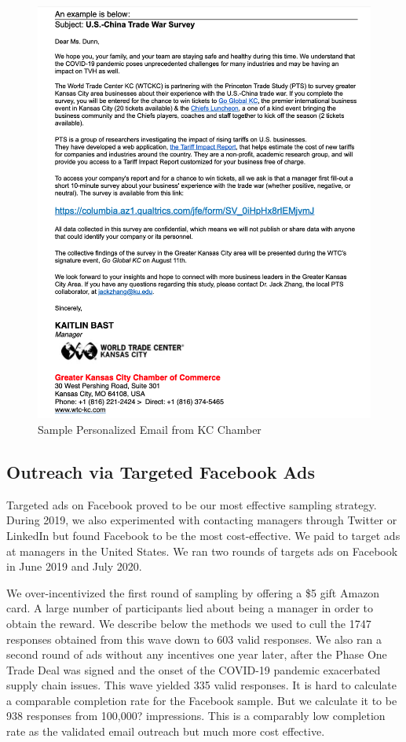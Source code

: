 \begin{figure}
    \centering
\includegraphics[scale=.5]{KC chamber email.png}
    \caption{Sample Personalized Email from KC Chamber}
    \label{fig:kcchamber}
\end{figure}

\subsection{Outreach via Targeted Facebook Ads}

Targeted ads on Facebook proved to be our most effective sampling strategy. During 2019, we also experimented with contacting managers through Twitter or LinkedIn but found Facebook to be the most cost-effective. We paid to target ads at managers in the United States. We ran two rounds of targets ads on Facebook in June 2019 and July 2020. 

We over-incentivized the first round of sampling by offering a \$5 gift Amazon card. A large number of participants lied about being a manager in order to obtain the reward. We describe below the methods we used to cull the 1747 responses obtained from this wave down to 603 valid responses. We also ran a second round of ads without any incentives one year later, after the Phase One Trade Deal was signed and the onset of the COVID-19 pandemic exacerbated supply chain issues. This wave yielded 335 valid responses. It is hard to calculate a comparable completion rate for the Facebook sample. But we calculate it to be 938 responses from 100,000? impressions. This is a comparably low completion rate as the validated email outreach but much more cost effective.    

